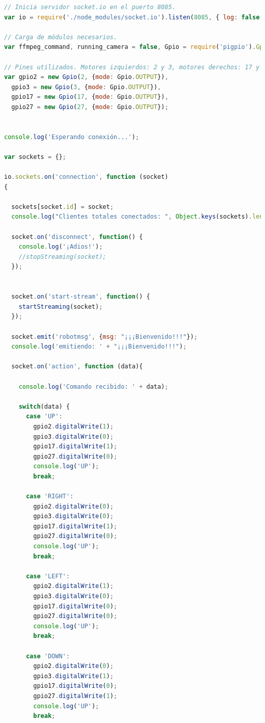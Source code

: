 \begin{lstlisting}[language=JavaScript]
// Inicia servidor socket.io en el puerto 8085.
var io = require('./node_modules/socket.io').listen(8085, { log: false });

// Carga de módulos necesarios.
var ffmpeg_command, running_camera = false, Gpio = require('pigpio').Gpio, child_process = require('child_process');

// Pines utilizados. Motores izquierdos: 2 y 3, motores derechos: 17 y 27
var gpio2 = new Gpio(2, {mode: Gpio.OUTPUT}),
  gpio3 = new Gpio(3, {mode: Gpio.OUTPUT}),
  gpio17 = new Gpio(17, {mode: Gpio.OUTPUT}),
  gpio27 = new Gpio(27, {mode: Gpio.OUTPUT});


console.log('Esperando conexión...');

var sockets = {};

io.sockets.on('connection', function (socket)
{

  sockets[socket.id] = socket;
  console.log("Clientes totales conectados: ", Object.keys(sockets).length);

  socket.on('disconnect', function() {
    console.log('¡Adios!');
    //stopStreaming(socket);
  });


  socket.on('start-stream', function() {
    startStreaming(socket);
  });

  socket.emit('robotmsg', {msg: "¡¡¡Bienvenido!!!"});
  console.log('emitiendo: ' + "¡¡¡Bienvenido!!!");

  socket.on('action', function (data){

    console.log('Comando recibido: ' + data);

    switch(data) {
      case 'UP':
        gpio2.digitalWrite(1);
        gpio3.digitalWrite(0);
        gpio17.digitalWrite(1);
        gpio27.digitalWrite(0);
        console.log('UP');
        break;

      case 'RIGHT':
        gpio2.digitalWrite(0);
        gpio3.digitalWrite(0);
        gpio17.digitalWrite(1);
        gpio27.digitalWrite(0);
        console.log('UP');
        break;

      case 'LEFT':
        gpio2.digitalWrite(1);
        gpio3.digitalWrite(0);
        gpio17.digitalWrite(0);
        gpio27.digitalWrite(0);
        console.log('UP');
        break;

      case 'DOWN':
        gpio2.digitalWrite(0);
        gpio3.digitalWrite(1);
        gpio17.digitalWrite(0);
        gpio27.digitalWrite(1);
        console.log('UP');
        break;


\end{lstlisting}
